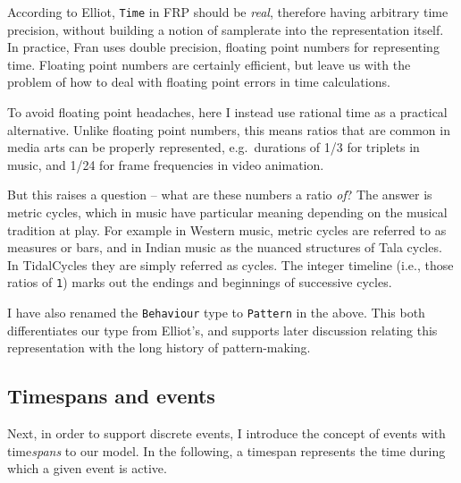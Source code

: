 According to Elliot, \texttt{Time} in FRP should be \emph{real},
therefore having arbitrary time precision, without building a notion of
samplerate into the representation itself. In practice, Fran uses double
precision, floating point numbers for representing time. Floating point
numbers are certainly efficient, but leave us with the problem of how to
deal with floating point errors in time calculations.

To avoid floating point headaches, here I instead use rational time as a
practical alternative. Unlike floating point numbers, this means ratios
that are common in media arts can be properly represented,
e.g.~durations of 1/3 for triplets in music, and 1/24 for frame
frequencies in video animation.

\begin{Shaded}
\begin{Highlighting}[]
  \OtherTok{=} 
 \OtherTok{=}  \OtherTok{{-}\textgreater{}}\NormalTok{ [a]}
\end{Highlighting}
\end{Shaded}

But this raises a question -- what are these numbers a ratio \emph{of}?
The answer is metric cycles, which in music have particular meaning
depending on the musical tradition at play. For example in Western
music, metric cycles are referred to as measures or bars, and in Indian
music as the nuanced structures of Tala cycles. In TidalCycles they are
simply referred as cycles. The integer timeline (i.e., those ratios of
\texttt{1}) marks out the endings and beginnings of successive cycles.

I have also renamed the \texttt{Behaviour} type to \texttt{Pattern} in
the above. This both differentiates our type from Elliot's, and supports
later discussion relating this representation with the long history of
pattern-making.

\subsection{Timespans and events}\label{timespans-and-events}

Next, in order to support discrete events, I introduce the concept of
events with time\emph{spans} to our model. In the following, a timespan
represents the time during which a given event is active.

\begin{Shaded}
\begin{Highlighting}[]
  \OtherTok{=} \NormalTok{ \{} \NormalTok{,} \NormalTok{\}}
 \OtherTok{=} \NormalTok{ \{} \NormalTok{,}
 \OtherTok{=}  \OtherTok{{-}\textgreater{}}\NormalTok{ [}\NormalTok{ a]}
\end{Highlighting}
\end{Shaded}

